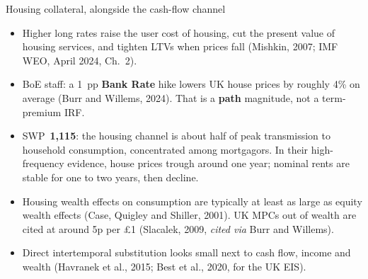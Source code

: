 \documentclass[11pt,aspectratio=169]{beamer}
\begin{document}
\begin{frame}{Housing collateral, alongside the cash-flow channel}
  \begin{itemize}
    \item Higher long rates raise the user cost of housing, cut the
          present value of housing services, and tighten LTVs when
          prices fall (Mishkin, 2007; IMF WEO, April 2024, Ch.~2).
    \item BoE staff: a 1~pp \textbf{Bank Rate} hike lowers UK house
          prices by roughly 4\% on average
          (Burr and Willems, 2024). That is a \textbf{path} magnitude,
          not a term-premium IRF.
    \item SWP~\textbf{1,115}: the housing channel is about half of peak
          transmission to household consumption, concentrated among
          mortgagors. In their high-frequency evidence, house prices
          trough around one year; nominal rents are stable for one to
          two years, then decline.
    \item Housing wealth effects on consumption are typically at least
          as large as equity wealth effects
          (Case, Quigley and Shiller, 2001). UK MPCs out of wealth
          are cited at around 5p per \pounds1
          (Slacalek, 2009, \emph{cited via} Burr and Willems).
    \item Direct intertemporal substitution looks small next to
          cash flow, income and wealth
          (Havranek et al., 2015; Best et al., 2020, for the UK EIS).
  \end{itemize}
\end{frame}
\end{document}
